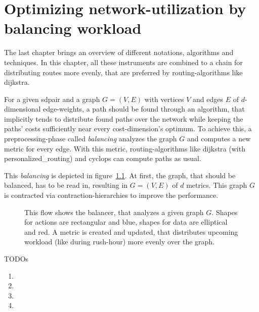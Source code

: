 \chapter{Optimizing network-utilization by balancing workload}
\label{chap:balancing}

The last chapter brings an overview of different notations, algorithms and techniques.
In this chapter, all these instruments are combined to a chain for distributing routes more evenly, that are preferred by routing-algorithms like \gls{dijkstra}.

For a given \gls{sdpair} and a graph $G = (V, E)$ with vertices $V$ and edges $E$ of $d$-dimensional edge-weights, a path should be found through an algorithm, that implicitly tends to distribute found paths over the network while keeping the paths' costs sufficiently near every cost-dimension's optimum.
To achieve this, a preprocessing-phase called \textit{balancing} analyzes the graph $G$ and computes a new metric for every edge.
With this metric, routing-algorithms like \gls{dijkstra}  (with \gls{personalized_routing}) and \gls{cyclops} can compute paths as usual.

This \textit{balancing} is depicted in figure~\ref{fig:balancing}.
At first, the graph, that should be balanced, has to be read in, resulting in $G = (V, E)$ of $d$ metrics.
This graph $G$ is contracted via \gls{contraction-hierarchies} to improve the performance.

\begin{figure}
    \centering
    
    \caption[Overview of balancing a graph]{%
        This flow shows the balancer, that analyzes a given graph $G$.
        Shapes for actions are rectangular and blue, shapes for data are elliptical and red.
        A metric is created and updated, that distributes upcoming workload (like during rush-hour) more evenly over the graph.
        \label{fig:balancing}
    }
\end{figure}


TODOs
\begin{enumerate}
    \item {}
    \item {}
    \item {}
    \item {}
\end{enumerate}


